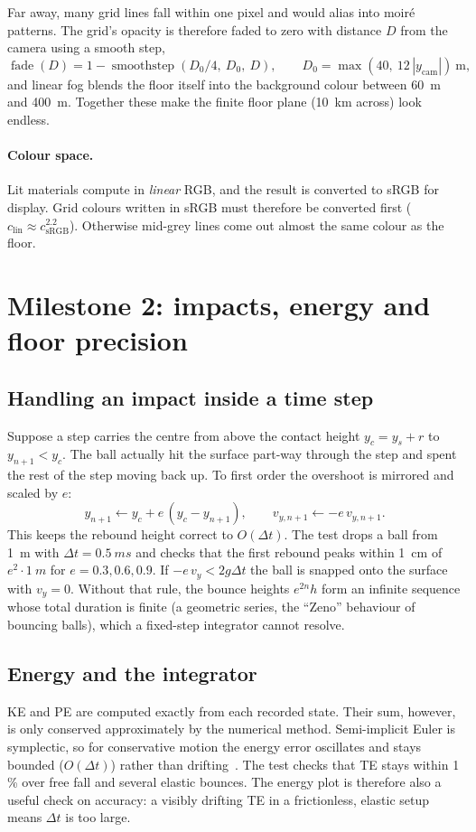 \documentclass[11pt]{article}
\begin{document}
Far away, many grid lines fall within one pixel and would alias into moiré patterns. The grid's
opacity is therefore faded to zero with distance $D$ from the camera using a smooth step,
\[
  \operatorname{fade}(D) = 1 - \operatorname{smoothstep}(D_0/4,\ D_0,\ D),\qquad D_0 = \max(40,\ 12\,|y_\text{cam}|)\ \text{m},
\]
and linear fog blends the floor itself into the background colour between \SI{60}{m} and \SI{400}{m}. Together
these make the finite floor plane (\SI{10}{km} across) look endless.

\paragraph{Colour space.} Lit materials compute in \emph{linear} RGB, and the result is converted to
sRGB for display. Grid colours written in sRGB must therefore be converted first
($c_\text{lin} \approx c_\text{sRGB}^{2.2}$). Otherwise mid-grey lines come out almost the same
colour as the floor.

\section{Milestone 2: impacts, energy and floor precision}

\subsection{Handling an impact inside a time step}
Suppose a step carries the centre from above the contact height $y_c = y_s + r$ to $y_{n+1} < y_c$. The ball actually hit
the surface part-way through the step and spent the rest of the step moving back up. To first order the overshoot is
mirrored and scaled by $e$:
\begin{equation}
  y_{n+1} \leftarrow y_c + e\,(y_c - y_{n+1}),\qquad v_{y,n+1} \leftarrow -e\,v_{y,n+1}.
\end{equation}
This keeps the rebound height correct to $O(\Delta t)$. The test drops a ball from \SI{1}{m} with
$\Delta t=\SI{0.5}{ms}$ and checks that the first rebound peaks within \SI{1}{cm} of $e^2\cdot\SI{1}{m}$ for $e = 0.3, 0.6, 0.9$.
If $-e\,v_y < 2g\Delta t$ the ball is snapped onto the surface with $v_y=0$. Without that rule, the bounce heights
$e^{2n}h$ form an infinite sequence whose total duration is finite (a geometric series, the ``Zeno'' behaviour of
bouncing balls), which a fixed-step integrator cannot resolve.

\subsection{Energy and the integrator}
KE and PE are computed exactly from each recorded state. Their sum, however, is only conserved approximately by the numerical
method. Semi-implicit Euler is symplectic, so for conservative motion the energy error oscillates and stays bounded
($O(\Delta t)$) rather than drifting~\cite{hairer2006}. The test checks that TE stays within 1\,\% over free fall and several elastic
bounces. The energy plot is therefore also a useful check on accuracy: a visibly drifting TE in a frictionless, elastic setup
means $\Delta t$ is too large.
\end{document}
